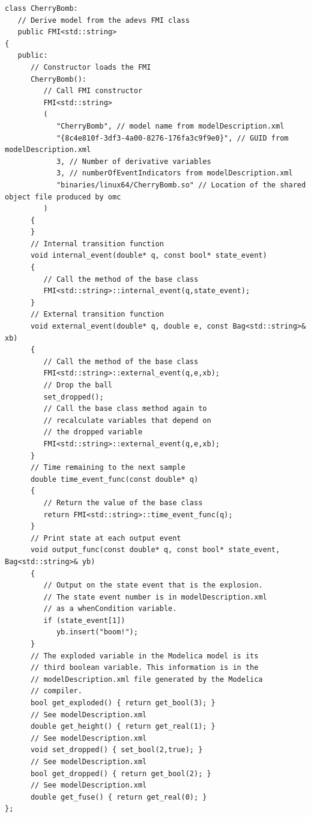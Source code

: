\begin{verbatim}
class CherryBomb:
   // Derive model from the adevs FMI class
   public FMI<std::string>
{
   public:
      // Constructor loads the FMI
      CherryBomb():
         // Call FMI constructor
         FMI<std::string>
         (
            "CherryBomb", // model name from modelDescription.xml
            "{8c4e810f-3df3-4a00-8276-176fa3c9f9e0}", // GUID from modelDescription.xml
            3, // Number of derivative variables
            3, // numberOfEventIndicators from modelDescription.xml
            "binaries/linux64/CherryBomb.so" // Location of the shared object file produced by omc
         )
      {
      }
      // Internal transition function
      void internal_event(double* q, const bool* state_event)
      {
         // Call the method of the base class
         FMI<std::string>::internal_event(q,state_event);
      }
      // External transition function
      void external_event(double* q, double e, const Bag<std::string>& xb)
      {
         // Call the method of the base class
         FMI<std::string>::external_event(q,e,xb);
         // Drop the ball
         set_dropped();
         // Call the base class method again to 
         // recalculate variables that depend on
         // the dropped variable
         FMI<std::string>::external_event(q,e,xb);
      }
      // Time remaining to the next sample
      double time_event_func(const double* q)
      {
         // Return the value of the base class
         return FMI<std::string>::time_event_func(q);
      }
      // Print state at each output event
      void output_func(const double* q, const bool* state_event, Bag<std::string>& yb)
      {
         // Output on the state event that is the explosion.
         // The state event number is in modelDescription.xml
         // as a whenCondition variable.
         if (state_event[1])
            yb.insert("boom!");
      }
      // The exploded variable in the Modelica model is its 
      // third boolean variable. This information is in the
      // modelDescription.xml file generated by the Modelica
      // compiler.
      bool get_exploded() { return get_bool(3); }
      // See modelDescription.xml
      double get_height() { return get_real(1); }
      // See modelDescription.xml
      void set_dropped() { set_bool(2,true); }
      // See modelDescription.xml
      bool get_dropped() { return get_bool(2); }
      // See modelDescription.xml
      double get_fuse() { return get_real(0); }
};
\end{verbatim}


